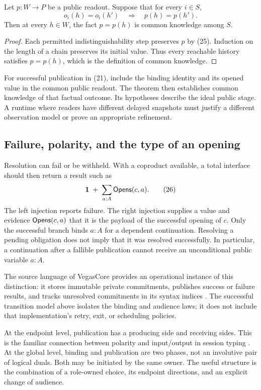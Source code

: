 \begin{theorem}
\label{thm:common-knowledge}
Let $p:W\to P$ be a public readout. Suppose that for every $i\in S$,
\[
 o_i(h)=o_i(h')\quad\Longrightarrow\quad p(h)=p(h').
 \tag{25}
\]
Then at every $h\in W$, the fact $p=p(h)$ is common knowledge among $S$.
\end{theorem}
\begin{proof}
Each permitted indistinguishability step preserves $p$ by (25). Induction on
the length of a chain preserves its initial value. Thus every reachable
history satisfies $p=p(h)$, which is the definition of common knowledge.
\end{proof}

For successful publication in (21), include the binding identity and its
opened value in the common public readout. The theorem then establishes
common knowledge of that factual outcome. Its hypotheses describe the ideal
public stage. A runtime where readers have different delayed snapshots must
justify a different observation model or prove an appropriate refinement.

\subsection{Failure, polarity, and the type of an opening}

Resolution can fail or be withheld. With a coproduct available, a total
interface should then return a result such as
\[
 \mathbf 1\; +\;\sum_{a:A}\mathsf{Opens}(c,a).
 \tag{26}
\]
The left injection reports failure. The right injection supplies a value and
evidence $\mathsf{Opens}(c,a)$ that it is the payload of the successful opening of
$c$. Only the successful branch binds $a:A$ for a dependent continuation.
Resolving a pending
obligation does not imply that it was resolved successfully. In particular,
a continuation after a fallible publication cannot receive an unconditional
public variable $a:A$.

The source language of VegasCore provides an operational instance of this
distinction: it stores immutable private commitments, publishes success or
failure results, and tracks unresolved commitments in its syntax indices
\cite{VegasCore2026}. The successful transition model above isolates the
binding and audience laws; it does not include that implementation's retry,
exit, or scheduling policies.

At the endpoint level, publication has a producing side and receiving sides.
This is the familiar connection between polarity and input/output in session
typing \cite{Griffith2016}. At the global level, binding and publication are
two phases, not an involutive pair of logical duals. Both may be initiated by
the same owner. The useful structure is the combination of a role-owned
choice, its endpoint directions, and an explicit change of audience.
